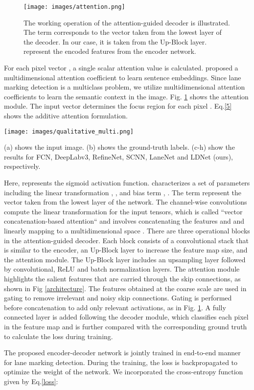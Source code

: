 \documentclass[journal]{IEEEtran}
\begin{document}
\begin{figure}[t]
\centering
\texttt{[image: images/attention.png]}
\caption{The working operation of the attention-guided decoder is illustrated. The term  corresponds to the vector taken from the lowest layer of the decoder. In our case, it is taken from the Up-Block layer.  represent the encoded features from the encoder network. }
\label{atten}
\end{figure}
For each pixel vector , a single scalar attention value is calculated. \cite{a5} proposed a multidimensional attention coefficient to learn sentence embeddings. Since lane marking detection is a multiclass problem, we utilize multidimensional attention coefficients to learn the semantic context in the image. Fig. \ref{atten} shows the attention module. The input vector  determines the focus region for each pixel . Eq.\ref{5} shows the additive attention formulation.
\begin{figure*}[t]
      \centering
      \texttt{[image: images/qualitative\_multi.png]}
\caption{The qualitative comparison between different lane detection methods using multiclass labels. There are 5 classes: background, lane-1, lane-2, lane-3 and lane-4.} (a) shows the input image. (b) shows the ground-truth labels. (c-h) show the results for FCN, DeepLabv3, RefineNet, SCNN, LaneNet and LDNet (ours), respectively. 
      \label{multi-class}
\end{figure*}



Here,  represents the sigmoid activation function.  characterizes a set of parameters including the linear transformation , ,  and bias term , .  The term  represent the vector taken from the lowest layer of the network. The channel-wise  convolutions compute the linear transformation for the input tensors, which is called ``vector concatenation-based attention`` and involves concatenating the features  and  and linearly mapping to a  multidimensional space \cite{a6}. There are three operational blocks in the attention-guided decoder. Each block consists of a convolutional stack that is similar to the encoder, an Up-Block layer to increase the feature map size, and the attention module. The Up-Block layer includes an upsampling layer followed by convolutional, ReLU and batch normalization layers. The attention module highlights the salient features that are carried through the skip connections, as shown in Fig \ref{architecture}. The features obtained at the coarse scale are used in gating to remove irrelevant and noisy skip connections. 
Gating is performed 
before concatenation to add only relevant activations, as in Fig. \ref{atten}. A fully connected layer is added following the decoder module, which classifies each pixel in the feature map and is further compared with the corresponding ground truth to calculate the loss during training.
\par 
 The proposed encoder-decoder network is jointly trained in end-to-end manner for lane marking detection. During the training, the loss is backpropagated to optimize the weight of the network. We incorporated the cross-entropy function given by  Eq.\ref{loss}:
\end{document}
